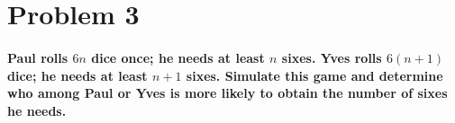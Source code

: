 \documentclass[12pt,letterpaper]{article}
\begin{document}
    \newpage


    \section*{Problem 3}
       
    \paragraph*{Paul rolls $6n$ dice once; he needs at least $n$ sixes. Yves rolls $6(n + 1)$ dice; he needs at least $n + 1$ sixes. Simulate this game and determine who among Paul or Yves is more likely to obtain the number of sixes he needs.}
    \hspace*{1cm}
    \vspace*{0.5cm}
\end{document}
